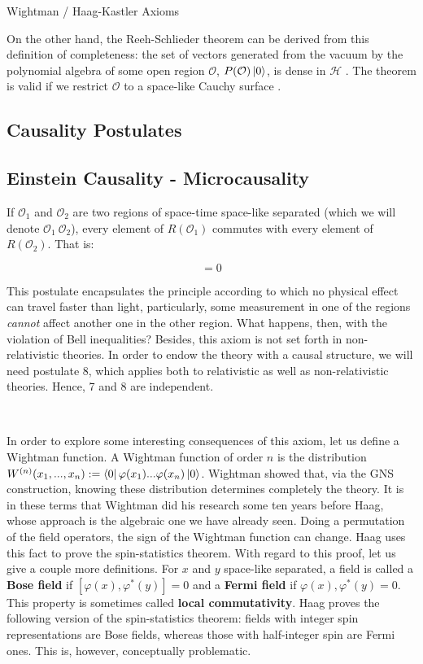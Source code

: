 \documentclass[12pt]{article}
\begin{document}
\begin{section}{Wightman / Haag-Kastler Axioms}
\

On the other hand, the Reeh-Schlieder theorem can be derived from this definition of completeness: the set of vectors generated from the vacuum by the polynomial algebra of some open region $\mathcal{O}$, $P(\mathcal{O})\ket{0}$, is dense in $\mathcal{H}$ \cite{haag_local_1996}. The theorem is valid if we restrict $\mathcal{O}$ to a space-like Cauchy surface \cite{witten_notes_2018}.

\subsection*{Causality Postulates}

\subsection{Einstein Causality - Microcausality}

If $\mathcal{O}_1$ and $\mathcal{O}_2$ are two regions of space-time space-like separated (which we will denote $\mathcal{O}_1 ~ \mathcal{O}_2$), every element of $R(\mathcal{O}_1)$ commutes with every element of $R(\mathcal{O}_2)$. That is:

\begin{equation}
[R(\mathcal{O}_1),R(\mathcal{O}_2)]=0
\end{equation}

This postulate encapsulates the principle according to which no physical effect can travel faster than light, particularly, some measurement in one of the regions \textit{cannot} affect another one in the other region. What happens, then, with the violation of Bell inequalities? Besides, this axiom is not set forth in non-relativistic theories. In order to endow the theory with a causal structure, we will need postulate 8, which applies both to relativistic as well as non-relativistic theories. Hence, 7 and 8 are independent.

\

In order to explore some interesting consequences of this axiom, let us define a Wightman function. A Wightman function of order $n$ is the distribution $W^{(n)} (x_1, ..., x_n) := \bra{0} \varphi (x_1) ... \varphi (x_n) \ket{0}$. Wightman showed that, via the GNS construction, knowing these distribution determines completely the theory. It is in these terms that Wightman did his research some ten years before Haag, whose approach is the algebraic one we have already seen. Doing a permutation of the field operators, the sign of the Wightman function can change. Haag uses this fact to prove the spin-statistics theorem. With regard to this proof, let us give a couple more definitions. For $x$ and $y$ space-like separated, a field is called a \textbf{Bose field} if $[\varphi (x), \varphi ^* (y)]=0$ and a \textbf{Fermi field} if ${\varphi (x) , \varphi ^* (y)}=0$. This property is sometimes called \textbf{local commutativity}. Haag \cite{haag_local_1996} proves the following version of the spin-statistics theorem: fields with integer spin representations are Bose fields, whereas those with half-integer spin are Fermi ones. This is, however, conceptually problematic.


\end{section}
\end{document}
